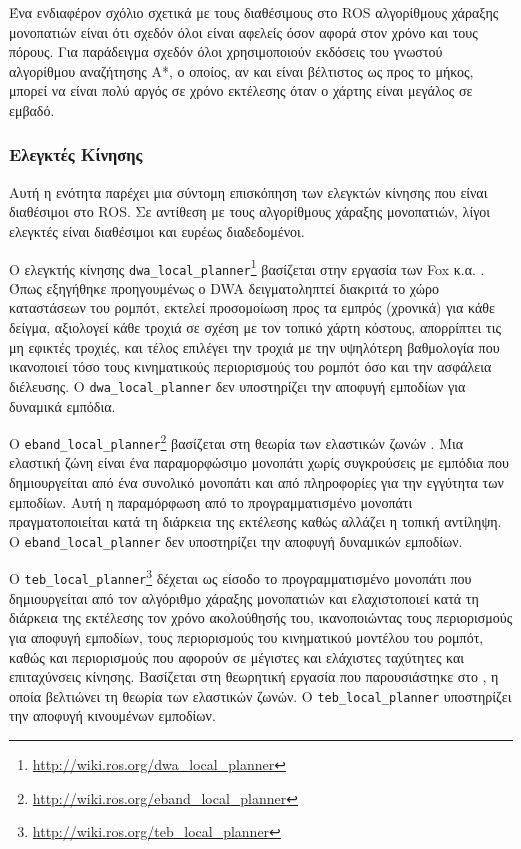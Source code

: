 Ένα ενδιαφέρον σχόλιο σχετικά με τους διαθέσιμους στο ROS αλγορίθμους
χάραξης μονοπατιών είναι ότι σχεδόν όλοι είναι αφελείς όσον αφορά στον χρόνο
και τους πόρους. Για παράδειγμα σχεδόν όλοι χρησιμοποιούν εκδόσεις του γνωστού
αλγορίθμου αναζήτησης A*, ο οποίος, αν και είναι βέλτιστος ως προς το μήκος,
μπορεί να είναι πολύ αργός σε χρόνο εκτέλεσης όταν ο χάρτης είναι μεγάλος σε
εμβαδό.

\subsubsection{Ελεγκτές Κίνησης}
\label{subsubsection:02_01_02:03_02}

Αυτή η ενότητα παρέχει μια σύντομη επισκόπηση των ελεγκτών κίνησης που είναι
διαθέσιμοι στο ROS. Σε αντίθεση με τους αλγορίθμους χάραξης μονοπατιών, λίγοι
ελεγκτές είναι διαθέσιμοι και ευρέως διαδεδομένοι.

Ο ελεγκτής κίνησης
\texttt{dwa\_local\_planner}\footnote{\url{http://wiki.ros.org/dwa\_local\_planner}}
βασίζεται στην εργασία των Fox κ.α. \cite{Fox1997}. Όπως εξηγήθηκε
προηγουμένως ο DWA δειγματοληπτεί διακριτά το χώρο καταστάσεων του ρομπότ,
εκτελεί προσομοίωση προς τα εμπρός (χρονικά) για κάθε δείγμα, αξιολογεί κάθε
τροχιά σε σχέση με τον τοπικό χάρτη κόστους, απορρίπτει τις μη εφικτές τροχιές,
και τέλος επιλέγει την τροχιά με την υψηλότερη βαθμολογία που ικανοποιεί τόσο
τους κινηματικούς περιορισμούς του ρομπότ όσο και την ασφάλεια διέλευσης. Ο
\texttt{dwa\_local\_planner} δεν υποστηρίζει την αποφυγή εμποδίων για δυναμικά
εμπόδια.

Ο
\texttt{eband\_local\_planner}\footnote{\url{http://wiki.ros.org/eband\_local\_planner}}
βασίζεται στη θεωρία των ελαστικών ζωνών \cite{Quinlan}. Μια ελαστική ζώνη
είναι ένα παραμορφώσιμο μονοπάτι χωρίς συγκρούσεις με εμπόδια που δημιουργείται
από ένα συνολικό μονοπάτι και από πληροφορίες για την εγγύτητα των εμποδίων.
Αυτή η παραμόρφωση από το προγραμματισμένο μονοπάτι πραγματοποιείται κατά τη
διάρκεια της εκτέλεσης καθώς αλλάζει η τοπική αντίληψη.  Ο
\texttt{eband\_local\_planner} δεν υποστηρίζει την αποφυγή δυναμικών εμποδίων.

Ο
\texttt{teb\_local\_planner}\footnote{\url{http://wiki.ros.org/teb\_local\_planner}}
δέχεται ως είσοδο το προγραμματισμένο μονοπάτι που δημιουργείται από τον
αλγόριθμο χάραξης μονοπατιών και ελαχιστοποιεί κατά τη διάρκεια της
εκτέλεσης τον χρόνο ακολούθησής του, ικανοποιώντας τους περιορισμούς για
αποφυγή εμποδίων, τους περιορισμούς του κινηματικού μοντέλου του ρομπότ, καθώς
και περιορισμούς που αφορούν σε μέγιστες και ελάχιστες ταχύτητες και
επιταχύνσεις κίνησης.  Βασίζεται στη θεωρητική εργασία που παρουσιάστηκε στο
\cite{Rosmann2017}, η οποία βελτιώνει τη θεωρία των ελαστικών ζωνών. Ο
\texttt{teb\_local\_planner} υποστηρίζει την αποφυγή κινουμένων εμποδίων.
